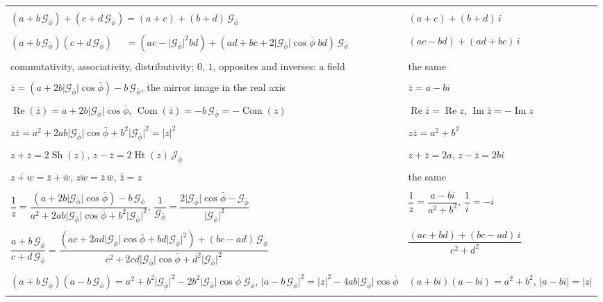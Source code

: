 \documentclass[11pt,a4paper]{amsart}
\makeatletter
\theoremstyle{plain}
\theoremstyle{definition}
\theoremstyle{remark}
\newcommand{\pb}{\bar{\phi}}                     %
\newcommand{\Gp}{\mathcal{G}_{\bar{\phi}}}       %
\newcommand{\Jp}{\mathcal{J}_{\bar{\phi}}}       %
\renewcommand{\Re}{\operatorname{Re}}            %
\DeclareMathOperator{\Com}{Com}                  %
\DeclareMathOperator{\Sh}{Sh}                    %
\DeclareMathOperator{\Ht}{Ht}                    %
\newcommand{\gnlaw}[3]{\multicolumn{2}{@{}l@{}}{\small\itshape #1}\\* #2 & #3 \\ \addlinespace[4pt]}
\newenvironment{gnlaws}{%
  \begin{longtable}{@{}>{\small\raggedright\arraybackslash}p{0.62\textwidth}@{\hspace{0.04\textwidth}}>{\small\raggedright\arraybackslash}p{0.32\textwidth}@{}}
  \toprule
  \multicolumn{1}{@{}l}{\textsc{in a relative plane}} & \multicolumn{1}{l@{}}{\textsc{the complex case}} \\
  \midrule
  \endhead
  \bottomrule
  \endlastfoot}
  {\end{longtable}}
\makeatother
\begin{document}
\begin{gnlaws}
\gnlaw{sum (\Cref{def:relative-plane})}
  {$(a + b\,\Gp) + (c + d\,\Gp) = (a + c) + (b + d)\,\Gp$}
  {$(a + c) + (b + d)\,i$}
\gnlaw{product (\Cref{prop:product})}
  {$(a + b\,\Gp)(c + d\,\Gp)$ \newline $\quad = (ac - \lvert\Gp\rvert^2bd) + (ad + bc + 2\lvert\Gp\rvert\cos\pb\;bd)\,\Gp$}
  {$(ac - bd) + (ad + bc)\,i$}
\gnlaw{the rules of arithmetic (\Cref{thm:field})}
  {commutativity, associativity, distributivity; $0$, $1$, opposites and inverses: a field}
  {the same}
\gnlaw{conjugate (\Cref{def:conjugate,thm:conjugate})}
  {$\bar{z} = (a + 2b\lvert\Gp\rvert\cos\pb) - b\,\Gp$, the mirror image in the real axis}
  {$\bar{z} = a - bi$}
\gnlaw{the parts of the conjugate (\Cref{prop:parts-conjugate})}
  {$\Re(\bar{z}) = a + 2b\lvert\Gp\rvert\cos\pb$, \quad $\Com(\bar{z}) = -b\,\Gp = -\Com(z)$}
  {$\operatorname{Re}\bar{z} = \operatorname{Re} z$, \newline $\operatorname{Im}\bar{z} = -\operatorname{Im} z$}
\gnlaw{a number times its conjugate (\Cref{thm:conjugate})}
  {$z\bar{z} = a^2 + 2ab\lvert\Gp\rvert\cos\pb + b^2\lvert\Gp\rvert^2 = \lvert z\rvert^2$}
  {$z\bar{z} = a^2 + b^2$}
\gnlaw{a number plus or minus its conjugate (\Cref{thm:conjugate,prop:shadow-height})}
  {$z + \bar{z} = 2\Sh(z)$, \quad $z - \bar{z} = 2\Ht(z)\,\Jp$}
  {$z + \bar{z} = 2a$, \quad $z - \bar{z} = 2bi$}
\gnlaw{the conjugate of a sum and of a product (\Cref{thm:conjugate})}
  {$\overline{z + w} = \bar{z} + \bar{w}$, \quad $\overline{zw} = \bar{z}\,\bar{w}$, \quad $\bar{\bar{z}} = z$}
  {the same}
\gnlaw{inverse (\Cref{thm:division})}
  {$\dfrac{1}{z} = \dfrac{(a + 2b\lvert\Gp\rvert\cos\pb) - b\,\Gp}{a^2 + 2ab\lvert\Gp\rvert\cos\pb + b^2\lvert\Gp\rvert^2}$, \quad $\dfrac{1}{\Gp} = \dfrac{2\lvert\Gp\rvert\cos\pb - \Gp}{\lvert\Gp\rvert^2}$}
  {$\dfrac{1}{z} = \dfrac{a - bi}{a^2 + b^2}$, \quad $\dfrac{1}{i} = -i$}
\gnlaw{quotient (\Cref{thm:division})}
  {$\dfrac{a + b\,\Gp}{c + d\,\Gp} = \dfrac{(ac + 2ad\lvert\Gp\rvert\cos\pb + bd\lvert\Gp\rvert^2) + (bc - ad)\,\Gp}{c^2 + 2cd\lvert\Gp\rvert\cos\pb + d^2\lvert\Gp\rvert^2}$}
  {$\dfrac{(ac + bd) + (bc - ad)\,i}{c^2 + d^2}$}
\gnlaw{the skew flip, which is not the conjugate (\Cref{rem:skew-flip})}
  {$(a + b\,\Gp)(a - b\,\Gp) = a^2 + b^2\lvert\Gp\rvert^2 - 2b^2\lvert\Gp\rvert\cos\pb\;\Gp$, \newline $\lvert a - b\,\Gp\rvert^2 = \lvert z\rvert^2 - 4ab\lvert\Gp\rvert\cos\pb$}
  {$(a + bi)(a - bi) = a^2 + b^2$, \newline $\lvert a - bi\rvert = \lvert z\rvert$}
\end{gnlaws}
\end{document}
